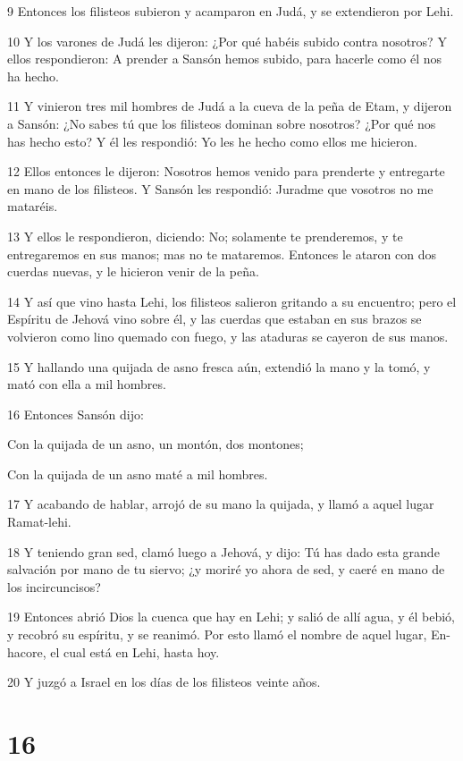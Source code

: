 \par 9 Entonces los filisteos subieron y acamparon en Judá, y se extendieron por Lehi.
\par 10 Y los varones de Judá les dijeron: ¿Por qué habéis subido contra nosotros? Y ellos respondieron: A prender a Sansón hemos subido, para hacerle como él nos ha hecho.
\par 11 Y vinieron tres mil hombres de Judá a la cueva de la peña de Etam, y dijeron a Sansón: ¿No sabes tú que los filisteos dominan sobre nosotros? ¿Por qué nos has hecho esto? Y él les respondió: Yo les he hecho como ellos me hicieron.
\par 12 Ellos entonces le dijeron: Nosotros hemos venido para prenderte y entregarte en mano de los filisteos. Y Sansón les respondió: Juradme que vosotros no me mataréis.
\par 13 Y ellos le respondieron, diciendo: No; solamente te prenderemos, y te entregaremos en sus manos; mas no te mataremos. Entonces le ataron con dos cuerdas nuevas, y le hicieron venir de la peña.
\par 14 Y así que vino hasta Lehi, los filisteos salieron gritando a su encuentro; pero el Espíritu de Jehová vino sobre él, y las cuerdas que estaban en sus brazos se volvieron como lino quemado con fuego, y las ataduras se cayeron de sus manos.
\par 15 Y hallando una quijada de asno fresca aún, extendió la mano y la tomó, y mató con ella a mil hombres.
\par 16 Entonces Sansón dijo:
\par Con la quijada de un asno, un montón, dos montones;
\par Con la quijada de un asno maté a mil hombres.
\par 17 Y acabando de hablar, arrojó de su mano la quijada, y llamó a aquel lugar Ramat-lehi.
\par 18 Y teniendo gran sed, clamó luego a Jehová, y dijo: Tú has dado esta grande salvación por mano de tu siervo; ¿y moriré yo ahora de sed, y caeré en mano de los incircuncisos?
\par 19 Entonces abrió Dios la cuenca que hay en Lehi; y salió de allí agua, y él bebió, y recobró su espíritu, y se reanimó. Por esto llamó el nombre de aquel lugar, En-hacore, el cual está en Lehi, hasta hoy.
\par 20 Y juzgó a Israel en los días de los filisteos veinte años.

\chapter{16}

